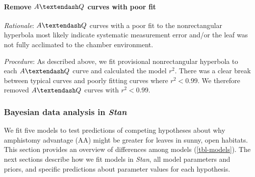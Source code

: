 \documentclass[
  letterpaper,
  DIV=11,
  numbers=noendperiod]{scrartcl}
\let\oldparagraph\paragraph
\renewcommand{\paragraph}[1]{\oldparagraph{#1}\mbox{}}
\newcommand{\aax}{$\mathrm{AA}$}
\newcommand{\aqcurve}{$A \textendash Q$}
\begin{document}
\paragraph{\texorpdfstring{Remove \aqcurve{} curves with poor
fit}{Remove  curves with poor fit}}\label{remove-curves-with-poor-fit}

\emph{Rationale}: \aqcurve{} curves with a poor fit to the
nonrectangular hyperbola most likely indicate systematic measurement
error and/or the leaf was not fully acclimated to the chamber
environment.

\emph{Procedure}: As described above, we fit provisional nonrectangular
hyperbola to each \aqcurve{} curve and calculated the model \(r^2\).
There was a clear break between typical curves and poorly fitting curves
where \(r^2 < 0.99\). We therefore removed \aqcurve{} curves with
\(r^2 < 0.99\).

\subsubsection{\texorpdfstring{Bayesian data analysis in
\emph{Stan}}{Bayesian data analysis in Stan}}\label{bayesian-data-analysis-in-stan}

We fit five models to test predictions of competing hypotheses about why
amphistomy advantage (\aax) might be greater for leaves in sunny, open
habitats. This section provides an overview of differences among models
(\autoref{tbl-models}). The next sections describe how we fit models in
\emph{Stan}, all model parameters and priors, and specific predictions
about parameter values for each hypothesis.
\end{document}
